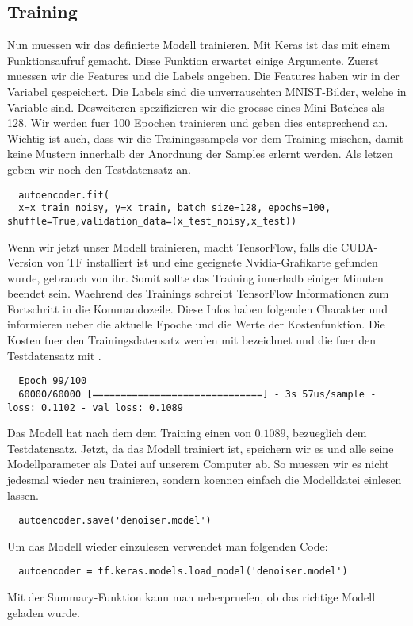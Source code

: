 \subsection{Training}
Nun muessen wir das definierte Modell trainieren.
Mit Keras ist das mit einem Funktionsaufruf gemacht. Diese Funktion erwartet
einige Argumente. Zuerst muessen wir die Features und die Labels angeben. Die
Features haben wir in der Variabel  gespeichert. Die Labels
sind die unverrauschten MNIST-Bilder, welche in Variable  sind.
Desweiteren spezifizieren wir die groesse eines Mini-Batches als 128. Wir werden
fuer 100 Epochen trainieren und geben dies entsprechend an. Wichtig ist auch,
dass wir die Trainingssampels vor dem Training mischen, damit keine Mustern
innerhalb der Anordnung der Samples erlernt werden. Als letzen geben wir noch
den Testdatensatz an.
\begin{verbatim}
  autoencoder.fit(
  x=x_train_noisy, y=x_train, batch_size=128, epochs=100, shuffle=True,validation_data=(x_test_noisy,x_test))
\end{verbatim}
Wenn wir jetzt unser Modell trainieren, macht TensorFlow, falls die CUDA-Version
von TF installiert ist und eine geeignete
Nvidia-Grafikarte gefunden wurde, gebrauch von ihr. Somit sollte das Training
innerhalb einiger Minuten beendet sein.
Waehrend des Trainings schreibt TensorFlow Informationen zum Fortschritt in die
Kommandozeile. Diese Infos haben folgenden Charakter und informieren ueber die aktuelle Epoche und die
Werte der Kostenfunktion. Die Kosten fuer den Trainingsdatensatz werden mit
 bezeichnet und die fuer den Testdatensatz mit .
\begin{verbatim}
  Epoch 99/100
  60000/60000 [==============================] - 3s 57us/sample - loss: 0.1102 - val_loss: 0.1089
\end{verbatim}
Das Modell hat nach dem dem Training einen  von $0.1089$,
bezueglich dem Testdatensatz.
\para{}
Jetzt, da das Modell trainiert ist, speichern wir es und alle seine
Modellparameter als Datei auf unserem Computer ab.
So muessen wir es nicht jedesmal wieder neu trainieren, sondern koennen einfach
die Modelldatei einlesen lassen.
\begin{verbatim}
  autoencoder.save('denoiser.model')
\end{verbatim}
Um das Modell wieder einzulesen verwendet man folgenden Code:
\begin{verbatim}
  autoencoder = tf.keras.models.load_model('denoiser.model')
\end{verbatim}
Mit der Summary-Funktion kann man ueberpruefen, ob das richtige Modell geladen wurde.

